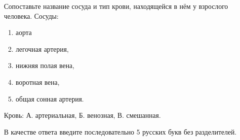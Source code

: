 
Сопоставьте название сосуда и тип крови, находящейся в нём у взрослого человека.
Сосуды:
\begin{enumerate}
    \item аорта
    \item легочная артерия,
    \item нижняя полая вена,
    \item воротная вена,
    \item общая сонная артерия.
\end{enumerate}

Кровь:
А. артериальная,
Б. венозная,
В. смешанная.

В качестве ответа введите последовательно 5 русских букв без разделителей.